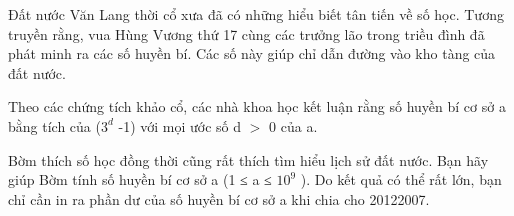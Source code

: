 Đất nước Văn Lang thời cổ xưa đã có những hiểu biết tân tiến về số học. Tương truyền rằng, vua Hùng Vương thứ 17 cùng các trưởng lão   trong triều đình đã phát minh ra các số huyền bí. Các số này giúp chỉ dẫn đường vào kho tàng của đất nước.  

   Theo các chứng tích khảo cổ, các nhà khoa học kết luận rằng số huyền bí cơ sở a bằng tích của ($3^{d}$   -1) với mọi ước số d $>$ 0   của a.  

   Bờm thích số học đồng thời cũng rất thích tìm hiểu lịch sử đất nước. Bạn hãy giúp Bờm tính số huyền bí cơ sở a (1 ≤ a ≤ $10^{9}$   ).   Do kết quả có thể rất lớn, bạn chỉ cần in ra phần dư của số huyền bí cơ sở a khi chia cho 20122007.